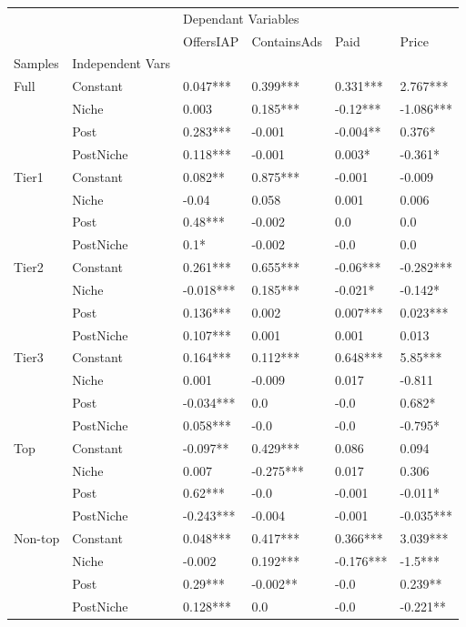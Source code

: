 \begin{table}[h!]
\centering
\begin{tabular}{llllll}
\toprule
        &           & \multicolumn{4}{l}{Dependant Variables} \\
        &           &           OffersIAP & ContainsAds &       Paid &      Price \\
Samples & Independent Vars &                     &             &            &            \\
\midrule
\multirow{4}{*}{Full} & Constant &  0.047*** &  0.399*** &  0.331*** &  2.767*** \\
        & Niche &  0.003 &  0.185*** &  -0.12*** &  -1.086*** \\
        & Post &  0.283*** &  -0.001 &  -0.004** &  0.376* \\
        & PostNiche &  0.118*** &  -0.001 &  0.003* &  -0.361* \\
\cline{1-6}
\multirow{4}{*}{Tier1} & Constant &  0.082** &  0.875*** &  -0.001 &  -0.009 \\
        & Niche &  -0.04 &  0.058 &  0.001 &  0.006 \\
        & Post &  0.48*** &  -0.002 &  0.0 &  0.0 \\
        & PostNiche &  0.1* &  -0.002 &  -0.0 &  0.0 \\
\cline{1-6}
\multirow{4}{*}{Tier2} & Constant &  0.261*** &  0.655*** &  -0.06*** &  -0.282*** \\
        & Niche &  -0.018*** &  0.185*** &  -0.021* &  -0.142* \\
        & Post &  0.136*** &  0.002 &  0.007*** &  0.023*** \\
        & PostNiche &  0.107*** &  0.001 &  0.001 &  0.013 \\
\cline{1-6}
\multirow{4}{*}{Tier3} & Constant &  0.164*** &  0.112*** &  0.648*** &  5.85*** \\
        & Niche &  0.001 &  -0.009 &  0.017 &  -0.811 \\
        & Post &  -0.034*** &  0.0 &  -0.0 &  0.682* \\
        & PostNiche &  0.058*** &  -0.0 &  -0.0 &  -0.795* \\
\cline{1-6}
\multirow{4}{*}{Top} & Constant &  -0.097** &  0.429*** &  0.086 &  0.094 \\
        & Niche &  0.007 &  -0.275*** &  0.017 &  0.306 \\
        & Post &  0.62*** &  -0.0 &  -0.001 &  -0.011* \\
        & PostNiche &  -0.243*** &  -0.004 &  -0.001 &  -0.035*** \\
\cline{1-6}
\multirow{4}{*}{Non-top} & Constant &  0.048*** &  0.417*** &  0.366*** &  3.039*** \\
        & Niche &  -0.002 &  0.192*** &  -0.176*** &  -1.5*** \\
        & Post &  0.29*** &  -0.002** &  -0.0 &  0.239** \\
        & PostNiche &  0.128*** &  0.0 &  -0.0 &  -0.221** \\
\bottomrule
\end{tabular}
\end{table}
